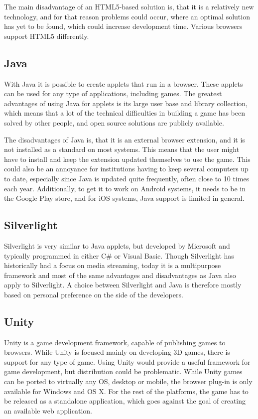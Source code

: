 The main disadvantage of an HTML5-based solution is, that it is a relatively new technology, and for that reason problems could occur, where an optimal solution has yet to be found, which could increase development time.
Various browsers support HTML5 differently.

\subsection{Java}
With Java it is possible to create applets that run in a browser.\cite{java13}
These applets can be used for any type of applications, including games.
The greatest advantages of using Java for applets is its large user base and library collection, which means that a lot of the technical difficulties in building a game has been solved by other people, and open source solutions are publicly available.\newline

The disadvantages of Java is, that it is an external browser extension, and it is not installed as a standard on most systems.
This means that the user might have to install and keep the extension updated themselves to use the game. 
This could also be an annoyance for institutions having to keep several computers up to date, especially since Java is updated quite frequently, often close to 10 times each year.\cite{javahistory13}
Additionally, to get it to work on Android systems, it needs to be in the Google Play store, and for iOS systems, Java support is limited in general.

\subsection{Silverlight}
Silverlight is very similar to Java applets, but developed by Microsoft and typically programmed in either C\# or Visual Basic.\cite{silverlight13}
Though Silverlight has historically had a focus on media streaming, today it is a multipurpose framework and most of the same advantages and disadvantages as Java also apply to Silverlight.
A choice between Silverlight and Java is therefore mostly based on personal preference on the side of the developers.

\subsection{Unity}
Unity is a game development framework, capable of publishing games to browsers.\cite{unity13} 
While Unity is focused mainly on developing 3D games, there is support for any type of game.
Using Unity would provide a useful framework for game development, but distribution could be problematic.
While Unity games can be ported to virtually any OS, desktop or mobile, the browser plug-in is only available for Windows and OS X.
For the rest of the platforms, the game has to be released as a standalone application, which goes against the goal of creating an available web application.

